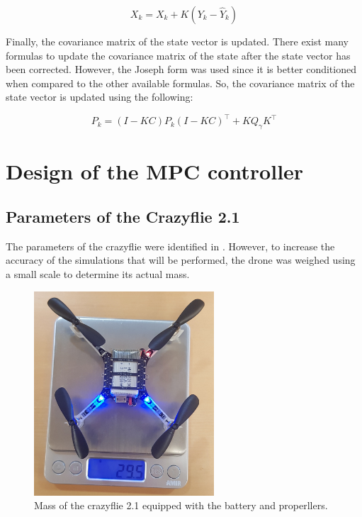 \documentclass{thesisreport}
\begin{document}
    \begin{equation}
        X_k = X_k + K (Y_k-\hat{Y}_k)
    \end{equation}
    
    Finally, the covariance matrix of the state vector is updated. There exist many formulas to update the covariance matrix of the state after the state vector has been corrected. However, the Joseph form was used since it is better conditioned when compared to the other available formulas. So, the covariance matrix of the state vector is updated using the following: 
    
    \begin{equation}
        P_k = ( I - K C) P_k ( I - K C)^{\intercal} + K Q_{\gamma} K^{\intercal}
    \end{equation}

\newpage

\section{Design of the MPC controller}

\subsection{Parameters of the Crazyflie 2.1}\label{subsec:parameters_of_the_crazyflie}

The parameters of the crazyflie were identified in \cite{Forster2015}. However, to increase the accuracy of the simulations that will be performed, the drone was weighed using a small scale to determine its actual mass.

\begin{figure}[h]
	\centering
	\includegraphics[width=0.6\textwidth, angle =-90]{Images/crazyflie/weight.jpg}
	\caption{Mass of the crazyflie 2.1 equipped with the battery and properllers.}
	\label{fig:crazyflie_weight}
\end{figure}
\end{document}
